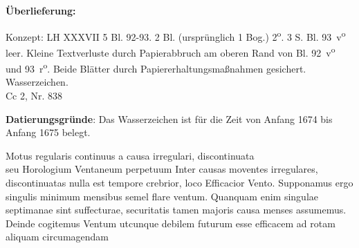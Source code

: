 \begin{ledgroupsized}[r]{120mm}
\footnotesize 
\pstart
\noindent
\textbf{\"{U}berlieferung:}
\pend
\end{ledgroupsized}
\begin{ledgroupsized}[r]{114mm}
\footnotesize 
\pstart
\parindent -6mm
Konzept: LH XXXVII 5 Bl. 92-93. 2 Bl. (ursprünglich 1 Bog.) 2\textsuperscript{o}. 3 S. Bl. 93~v\textsuperscript{o} leer. Kleine Textverluste durch Papierabbruch am oberen Rand von Bl. 92~v\textsuperscript{o} und 93~r\textsuperscript{o}. Beide Blätter durch Papiererhaltungsmaßnahmen gesichert. Wasserzeichen. \\Cc 2, Nr.  838
\pend
\end{ledgroupsized}
%
\vspace*{5mm}
\begin{ledgroup}
\footnotesize 
\pstart
\noindent
\footnotesize{\textbf{Datierungsgr\"{u}nde}: Das Wasserzeichen ist für die Zeit von Anfang 1674 bis Anfang 1675 belegt.}
\pend
\end{ledgroup}
%
\vspace*{8mm}
\count{}
\pstart
\noindent
[92~r\textsuperscript{o}]
\pend
\pstart 
\normalsize
\centering %
Motus regularis continuus
a causa irregulari, discontinuata\\
seu Horologium Ventaneum\protect{} perpetuum
\pend
\vspace*{0.5em}
\pstart
\noindent
Inter causas moventes irregulares, discontinuatas nulla est tempore crebrior, loco
Efficacior Vento.\protect{}
\pend
\pstart
Supponamus ergo singulis minimum mensibus semel flare ventum.
Quanquam enim singulae septimanae sint suffecturae,
securitatis tamen majoris causa menses assumemus.
Deinde cogitemus Ventum utcunque debilem futurum esse efficacem ad rotam\protect{} aliquam circumagendam
